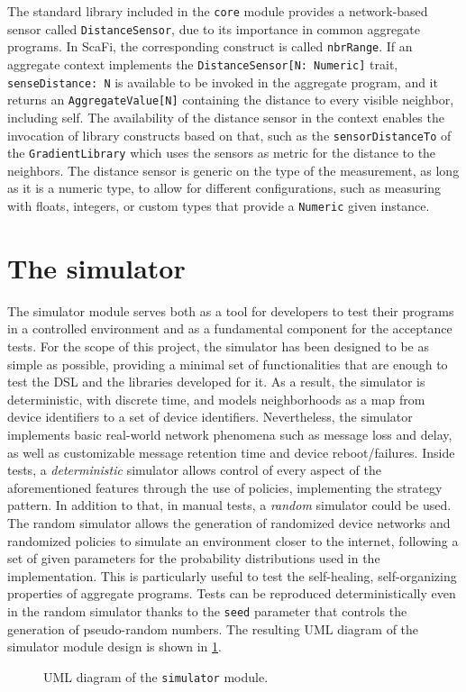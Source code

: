 The standard library included in the \texttt{core} module provides a network-based sensor called \texttt{DistanceSensor}, due to its importance in common aggregate programs.
%
In ScaFi, the corresponding construct is called \texttt{nbrRange}.
%
If an aggregate context implements the \texttt{DistanceSensor[N: Numeric]} trait, \texttt{senseDistance: N} is available to be invoked in the aggregate program, and it returns an \texttt{AggregateValue[N]} containing the distance to every visible neighbor, including self.
%
The availability of the distance sensor in the context enables the invocation of library constructs based on that, such as the \texttt{sensorDistanceTo} of the \texttt{GradientLibrary} which uses the sensors as metric for the distance to the neighbors.
%
The distance sensor is generic on the type of the measurement, as long as it is a numeric type, to allow for different configurations, such as measuring with floats, integers, or custom types that provide a \texttt{Numeric} given instance.


\section{The simulator}

The simulator module serves both as a tool for developers to test their programs in a controlled environment and as a fundamental component for the acceptance tests.
%
For the scope of this project, the simulator has been designed to be as simple as possible, providing a minimal set of functionalities that are enough to test the \ac{DSL} and the libraries developed for it.
%
As a result, the simulator is deterministic, with discrete time, and models neighborhoods as a map from device identifiers to a set of device identifiers.
%
Nevertheless, the simulator implements basic real-world network phenomena such as message loss and delay, as well as customizable message retention time and device reboot/failures.
%
Inside tests, a \textit{deterministic} simulator allows control of every aspect of the aforementioned features through the use of policies, implementing the strategy pattern.
%
In addition to that, in manual tests, a \textit{random} simulator could be used.
%
The random simulator allows the generation of randomized device networks and randomized policies to simulate an environment closer to the internet, following a set of given parameters for the probability distributions used in the implementation.
%
This is particularly useful to test the self-healing, self-organizing properties of aggregate programs.
%
Tests can be reproduced deterministically even in the random simulator thanks to the \texttt{seed} parameter that controls the generation of pseudo-random numbers.
%
The resulting \ac{UML} diagram of the simulator module design is shown in \cref{fig:simulator-uml}.

\begin{figure}
    \centering
    \caption{\ac{UML} diagram of the \texttt{simulator} module.}
    \label{fig:simulator-uml}
    \bigskip
    \resizebox{\linewidth}{!}{
        
    }
\end{figure}
